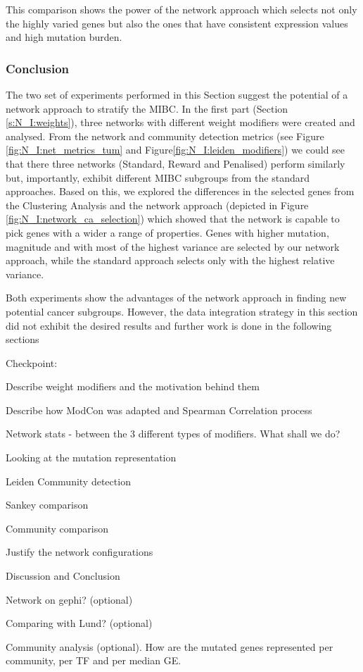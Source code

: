 This comparison shows the power of the network approach which selects not only the highly varied genes but also the ones that have consistent expression values and high mutation burden.

\subsubsection{Conclusion}

The two set of experiments performed in this Section suggest the potential of a network approach to stratify the MIBC. In the first part (Section \ref{s:N_I:weights}), three networks with different weight modifiers were created and analysed. From the network and community detection metrics (see Figure \ref{fig:N_I:net_metrics_tum} and Figure\ref{fig:N_I:leiden_modifiers}) we could see that there three networks (Standard, Reward and Penalised) perform similarly but, importantly, exhibit different MIBC subgroups from the standard approaches. Based on this, we explored the differences in the selected genes from the Clustering Analysis and the network approach (depicted in Figure \ref{fig:N_I:network_ca_selection}) which showed that the network is capable to pick genes with a wider a range of properties. Genes with higher mutation, magnitude and with most of the highest variance are selected by our network approach, while the standard approach selects only with the highest relative variance.

Both experiments show the advantages of the network approach in finding new potential cancer subgroups. However, the data integration strategy in this section did not exhibit the desired results and further work is done in the following sections

\vspace{50mm}

Checkpoint:
\begin{todolist}
    \item [\done] Describe weight modifiers and the motivation behind them
    \item [\done] Describe how ModCon was adapted and Spearman Correlation process 
    \item [\done] Network stats - between the 3 different types of modifiers. What shall we do?
    \item [\done] Looking at the mutation representation 
    \item [\done] Leiden Community detection
    \item [\done] Sankey comparison
    \item [\done] Community comparison 
    \item [\done] Justify the network configurations
    \item [\done] Discussion and Conclusion
    \item Network on gephi? (optional)
    \item Comparing with Lund? (optional)
    \item Community analysis (optional). How are the mutated genes represented per community, per TF and per median GE.
\end{todolist}